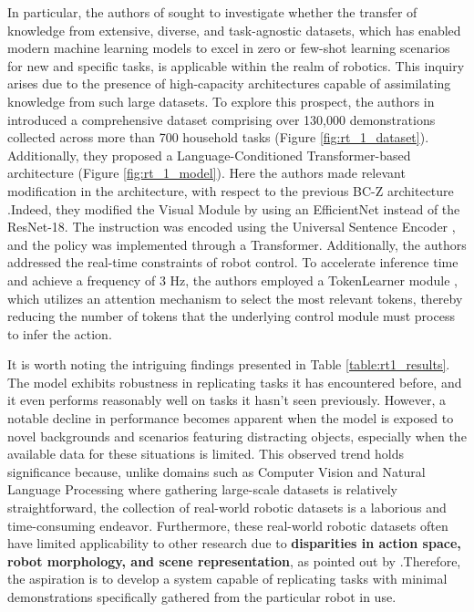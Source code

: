 In particular, the authors of \cite{brohan2022rt} sought to investigate whether the transfer of knowledge from extensive, diverse, and task-agnostic datasets, which has enabled modern machine learning models to excel in zero or few-shot learning scenarios for new and specific tasks, is applicable within the realm of robotics. This inquiry arises due to the presence of high-capacity architectures capable of assimilating knowledge from such large datasets. To explore this prospect, the authors in \cite{brohan2022rt} introduced a comprehensive dataset comprising over 130,000 demonstrations collected across more than 700 household tasks (Figure \ref{fig:rt_1_dataset}). Additionally, they proposed a Language-Conditioned Transformer-based architecture (Figure \ref{fig:rt_1_model}). Here the authors made relevant modification in the architecture, with respect to the previous BC-Z architecture \cite{jang2022bc_z}.Indeed, they modified the Visual Module by using an EfficientNet \cite{tan2019efficientnet} instead of the ResNet-18. The instruction was encoded using the Universal Sentence Encoder \cite{cer2018universal}, and the policy was implemented through a Transformer. Additionally, the authors addressed the real-time constraints of robot control. To accelerate inference time and achieve a frequency of $3$ Hz, the authors employed a TokenLearner module \cite{ryoo2021tokenlearner}, which utilizes an attention mechanism to select the most relevant tokens, thereby reducing the number of tokens that the underlying control module must process to infer the action.


It is worth noting the intriguing findings presented in Table \ref{table:rt1_results}. The model exhibits robustness in replicating tasks it has encountered before, and it even performs reasonably well on tasks it hasn't seen previously. However, a notable decline in performance becomes apparent when the model is exposed to novel backgrounds and scenarios featuring distracting objects, especially when the available data for these situations is limited. This observed trend holds significance because, unlike domains such as Computer Vision and Natural Language Processing where gathering large-scale datasets is relatively straightforward, the collection of real-world robotic datasets is a laborious and time-consuming endeavor. Furthermore, these real-world robotic datasets often have limited applicability to other research due to \textbf{disparities in action space, robot morphology, and scene representation}, as pointed out by \cite{brohan2022rt}.Therefore, the aspiration is to develop a system capable of replicating tasks with minimal demonstrations specifically gathered from the particular robot in use.
